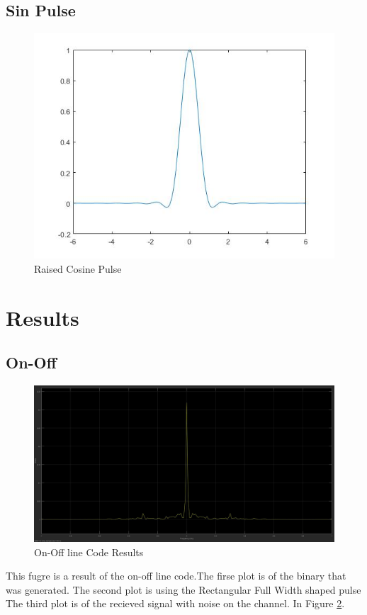 \documentclass{article}
\begin{document}
\subsection{Sin Pulse}
\begin{figure}[H]
  \begin{center}
    \includegraphics[width = \linewidth]{Raised_Cosine_Pulse.jpg}
    \caption{Raised Cosine Pulse}
    \label{fig:Sin-Pulse}
  \end{center}
\end{figure}

\section{Results}

\subsection{On-Off}
\begin{figure}[H]
  \includegraphics[width = \linewidth]{On_Off_Sin_Spectrum.jpg}
  \caption{On-Off line Code Results}
  \label{fig:on-Off}
\end{figure}
This fugre is a result of the on-off line code.The firse plot is of the binary
that was generated. The second plot is using the Rectangular Full Width shaped pulse
The third plot is of the recieved signal with noise on the channel. In Figure \ref{fig:on-Off}.
\end{document}
